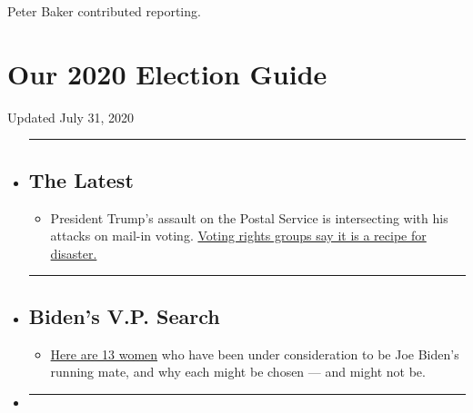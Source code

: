 Peter Baker contributed reporting.

\hypertarget{our-2020-election-guide}{%
\section{Our 2020 Election Guide}\label{our-2020-election-guide}}

Updated July 31, 2020

\begin{itemize}
\item
  \begin{center}\rule{0.5\linewidth}{\linethickness}\end{center}

  \hypertarget{the-latest}{%
  \subsection{The Latest}\label{the-latest}}

  \begin{itemize}
  \tightlist
  \item
    President Trump's assault on the Postal Service is intersecting with
    his attacks on mail-in voting.
    \href{https://www.nytimes.com/2020/07/31/us/politics/trump-usps-mail-delays.html?action=click\&pgtype=Article\&state=default\&region=BELOW_MAIN_CONTENT\&context=storylines_guide}{Voting
    rights groups say it is a recipe for disaster.}
  \end{itemize}
\item
  \begin{center}\rule{0.5\linewidth}{\linethickness}\end{center}

  \hypertarget{bidens-vp-search}{%
  \subsection{Biden's V.P. Search}\label{bidens-vp-search}}

  \begin{itemize}
  \tightlist
  \item
    \href{https://www.nytimes.com/article/biden-vice-president-2020.html?action=click\&pgtype=Article\&state=default\&region=BELOW_MAIN_CONTENT\&context=storylines_guide}{Here
    are 13 women} who have been under consideration to be Joe Biden's
    running mate, and why each might be chosen --- and might not be.
  \end{itemize}
\item
  \begin{center}\rule{0.5\linewidth}{\linethickness}\end{center}


\end{itemize}
